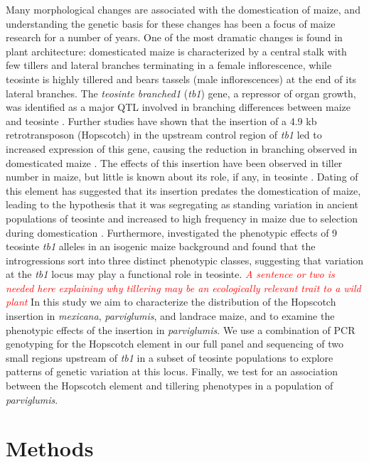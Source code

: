 \documentclass[12pt]{article}
\newcommand{\mbh}[1]{\textcolor{red}{ \emph{\scriptsize  #1}} }
\begin{document}
Many morphological changes are associated with the domestication of maize, and understanding the genetic basis for these changes has been a focus of maize research for a number of years. One of the most dramatic changes is found in plant architecture: domesticated maize is characterized by a central stalk with few tillers and lateral branches terminating in a female inflorescence, while teosinte is highly tillered and bears tassels (male inflorescences) at the end of its lateral branches. The \emph{teosinte branched1} (\emph{tb1}) gene, a repressor of organ growth, was identified as a major QTL involved in branching differences between maize and teosinte \cite{Doebley et al 1990, Doebley and Stec 1991, Lukens and Doebley 1999}. Further studies have shown that the insertion of a 4.9 kb retrotransposon (Hopscotch) in the upstream control region of \emph{tb1} led to increased expression of this gene, causing the reduction in branching observed in domesticated maize \cite{Studer et al 2011}. The effects of this insertion have been observed in tiller number in maize, but little is known about its role, if any, in teosinte \cite{Studer et al 2011}. Dating of this element has suggested that its insertion predates the domestication of maize, leading to the hypothesis that it was segregating as standing variation in ancient populations of teosinte and increased to high frequency in maize due to selection during domestication \cite{Studer et al 2011}. Furthermore, \cite{Studer and Doebley 2012} investigated the phenotypic effects of 9 teosinte \emph{tb1} alleles in an isogenic maize background and found that the introgressions sort into three distinct phenotypic classes, suggesting that variation at the \emph{tb1} locus may play a functional role in teosinte. \mbh{A sentence or two is needed here explaining why tillering may be an ecologically relevant trait to a wild plant} In this study we aim to characterize the distribution of the Hopscotch insertion in \emph{mexicana}, \emph{parviglumis}, and landrace maize, and to examine the phenotypic effects of the insertion in \emph{parviglumis}. We use a combination of PCR genotyping for the Hopscotch element in our full panel and sequencing of two small regions upstream of \emph{tb1} in a subset of teosinte populations to explore patterns of genetic variation at this locus. Finally, we test for an association between the Hopscotch element and tillering phenotypes in a population of \emph{parviglumis}.

 
\section*{Methods}
\end{document}
